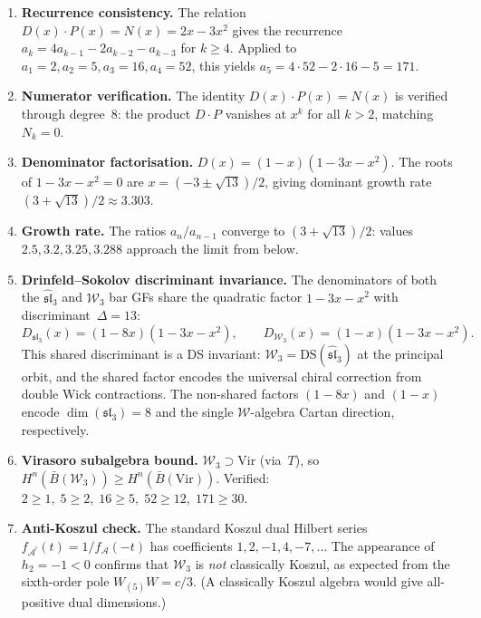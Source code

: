 \begin{enumerate}
\item \textbf{Recurrence consistency.}
  The relation $D(x) \cdot P(x) = N(x) = 2x - 3x^2$ gives
  the recurrence $a_k = 4a_{k-1} - 2a_{k-2} - a_{k-3}$
  for $k \ge 4$.  Applied to
  $a_1 = 2, a_2 = 5, a_3 = 16, a_4 = 52$,
  this yields $a_5 = 4 \cdot 52 - 2 \cdot 16 - 5 = 171$.

\item \textbf{Numerator verification.}
  The identity $D(x) \cdot P(x) = N(x)$ is verified through
  degree~$8$: the product $D \cdot P$ vanishes at $x^k$ for
  all $k > 2$, matching $N_k = 0$.

\item \textbf{Denominator factorisation.}
  $D(x) = (1-x)(1-3x-x^2)$.  The roots of $1-3x-x^2 = 0$
  are $x = (-3 \pm \sqrt{13})/2$, giving dominant growth rate
  $(3 + \sqrt{13})/2 \approx 3.303$.

\item \textbf{Growth rate.}
  The ratios $a_n / a_{n-1}$ converge to
  $(3 + \sqrt{13})/2$: values $2.5, 3.2, 3.25, 3.288$
  approach the limit from below.

\item \textbf{Drinfeld--Sokolov discriminant invariance.}
  The denominators of both the $\widehat{\mathfrak{sl}}_3$ and
  $\mathcal{W}_3$ bar GFs share the quadratic factor
  $1-3x-x^2$ with discriminant~$\Delta = 13$:
  \[
    D_{\mathfrak{sl}_3}(x) = (1-8x)(1-3x-x^2), \qquad
    D_{\mathcal{W}_3}(x) = (1-x)(1-3x-x^2).
  \]
  This shared discriminant is a DS invariant:
  $\mathcal{W}_3 = \mathrm{DS}(\widehat{\mathfrak{sl}}_3)$
  at the principal orbit, and the shared factor encodes
  the universal chiral correction from double Wick
  contractions.  The non-shared factors
  $(1-8x)$ and $(1-x)$ encode $\dim(\mathfrak{sl}_3) = 8$
  and the single $\mathcal{W}$-algebra Cartan direction,
  respectively.

\item \textbf{Virasoro subalgebra bound.}
  $\mathcal{W}_3 \supset \mathrm{Vir}$ (via~$T$), so
  $H^n(\bar{B}(\mathcal{W}_3)) \ge H^n(\bar{B}(\mathrm{Vir}))$.
  Verified: $2 \ge 1, \; 5 \ge 2, \; 16 \ge 5, \;
  52 \ge 12, \; 171 \ge 30$.

\item \textbf{Anti-Koszul check.}
  The standard Koszul dual Hilbert series
  $f_{\mathcal{A}^!}(t) = 1/f_{\mathcal{A}}(-t)$ has
  coefficients $1, 2, -1, 4, -7, \ldots$
  The appearance of $h_2 = -1 < 0$ confirms that
  $\mathcal{W}_3$ is \emph{not} classically Koszul,
  as expected from the sixth-order pole $W_{(5)}W = c/3$.
  (A classically Koszul algebra would give all-positive
  dual dimensions.)
\end{enumerate}

